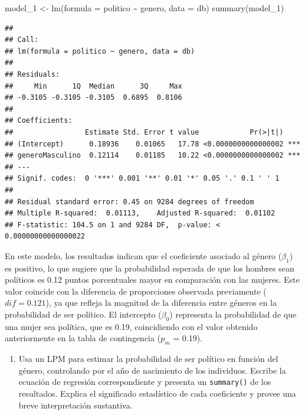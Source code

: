 \documentclass[
  12pt,
  a4paper,
]{article}
\newenvironment{Shaded}{\begin{snugshade}}{\end{snugshade}}
\newcommand{\AttributeTok}[1]{\textcolor[rgb]{0.77,0.63,0.00}{#1}}
\newcommand{\FunctionTok}[1]{\textcolor[rgb]{0.00,0.00,0.00}{#1}}
\newcommand{\NormalTok}[1]{#1}
\newcommand{\OtherTok}[1]{\textcolor[rgb]{0.56,0.35,0.01}{#1}}
\newcommand{\SpecialCharTok}[1]{\textcolor[rgb]{0.00,0.00,0.00}{#1}}
\providecommand{\tightlist}{%
  \setlength{\itemsep}{0pt}\setlength{\parskip}{0pt}}
\begin{document}
\begin{Shaded}
\begin{Highlighting}[]
\NormalTok{model\_1 }\OtherTok{\textless{}{-}} \FunctionTok{lm}\NormalTok{(}\AttributeTok{formula =}\NormalTok{ politico }\SpecialCharTok{\textasciitilde{}}\NormalTok{ genero, }\AttributeTok{data =}\NormalTok{ db)}
\FunctionTok{summary}\NormalTok{(model\_1)}
\end{Highlighting}
\end{Shaded}

\begin{verbatim}
## 
## Call:
## lm(formula = politico ~ genero, data = db)
## 
## Residuals:
##     Min      1Q  Median      3Q     Max 
## -0.3105 -0.3105 -0.3105  0.6895  0.8106 
## 
## Coefficients:
##                 Estimate Std. Error t value            Pr(>|t|)    
## (Intercept)      0.18936    0.01065   17.78 <0.0000000000000002 ***
## generoMasculino  0.12114    0.01185   10.22 <0.0000000000000002 ***
## ---
## Signif. codes:  0 '***' 0.001 '**' 0.01 '*' 0.05 '.' 0.1 ' ' 1
## 
## Residual standard error: 0.45 on 9284 degrees of freedom
## Multiple R-squared:  0.01113,    Adjusted R-squared:  0.01102 
## F-statistic: 104.5 on 1 and 9284 DF,  p-value: < 0.00000000000000022
\end{verbatim}

En este modelo, los resultados indican que el coeficiente asociado al género (\(\beta_{1}\)) es positivo, lo que sugiere que la probabilidad esperada de que los hombres sean políticos es 0.12 puntos porcentuales mayor en comparación con las mujeres. Este valor coincide con la diferencia de proporciones observada previamente (\(dif = 0.121\)), ya que refleja la magnitud de la diferencia entre géneros en la probabilidad de ser político. El intercepto (\(\beta_{0}\)) representa la probabilidad de que una mujer sea política, que es 0.19, coincidiendo con el valor obtenido anteriormente en la tabla de contingencia (\(p_m\) = 0.19).

\begin{enumerate}
\def\labelenumi{\arabic{enumi}.}
\setcounter{enumi}{2}
\tightlist
\item
  Usa un LPM para estimar la probabilidad de ser político en función del género, controlando por el año de nacimiento de los individuos. Escribe la ecuación de regresión correspondiente y presenta un \texttt{summary()} de los resultados. Explica el significado estadístico de cada coeficiente y provee una breve interpretación sustantiva.
\end{enumerate}
\end{document}
